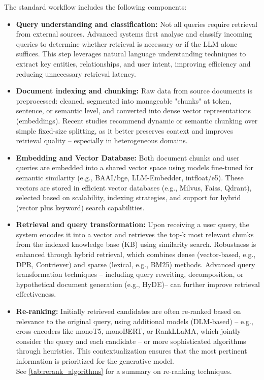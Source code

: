 \begin{spacing}{1.5}
The standard workflow includes the following components:
\begin{itemize}
  \item \textbf{Query understanding and classification:} Not all queries require retrieval from external sources. Advanced systems first analyse and classify incoming queries to determine whether retrieval is necessary or if the LLM alone suffices. This step leverages natural language understanding techniques to extract key entities, relationships, and user intent, improving efficiency and reducing unnecessary retrieval latency.
    \item \textbf{Document indexing and chunking:} Raw data from source documents is preprocessed: cleaned, segmented into manageable "chunks" at token, sentence, or semantic level, and converted into dense vector representations (embeddings). Recent studies recommend dynamic or semantic chunking over simple fixed-size splitting, as it better preserves context and improves retrieval quality -- especially in heterogeneous domains.
    \item \textbf{Embedding and Vector Database:} Both document chunks and user queries are embedded into a shared vector space using models fine-tuned for semantic similarity (e.g., BAAI/bge, LLM-Embedder, intfloat/e5). These vectors are stored in efficient vector databases (e.g., Milvus, Faiss, Qdrant), selected based on scalability, indexing strategies, and support for hybrid (vector plus keyword) search capabilities.
    \item \textbf{Retrieval and query transformation:} Upon receiving a user query, the system encodes it into a vector and retrieves the top-k most relevant chunks from the indexed knowledge base (KB) using similarity search. Robustness is enhanced through hybrid retrieval, which combines dense (vector-based, e.g., DPR, Contriever) and sparse (lexical, e.g., BM25) methods. Advanced query transformation techniques -- including query rewriting, decomposition, or hypothetical document generation (e.g., HyDE)-- can further improve retrieval effectiveness.
    \item \textbf{Re-ranking:} Initially retrieved candidates are often re-ranked based on relevance to the original query, using additional models (DLM-based) -- e.g., cross-encoders like monoT5, monoBERT, or RankLLaMA, which jointly consider the query and each candidate -- or more sophisticated algorithms through heuristics. This contextualization ensures that the most pertinent information is prioritized for the generative model.\\See \autoref{tab:rerank_algorithms} for a summary on re-ranking techniques.

\end{itemize}
\end{spacing}
